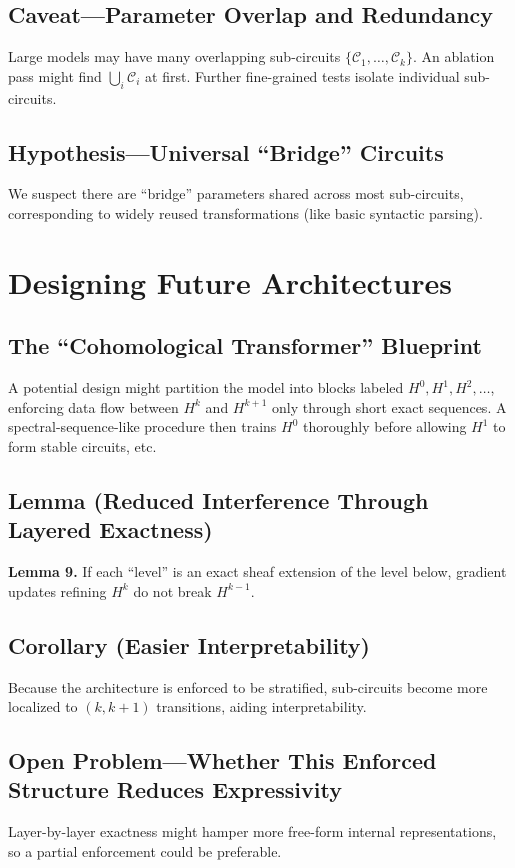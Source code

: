 \documentclass{article}
\begin{document}
\subsection{Caveat—Parameter Overlap and Redundancy}
Large models may have many overlapping sub-circuits $\{\mathcal{C}_1,\dots,\mathcal{C}_k\}$. An ablation pass might find $\bigcup_i \mathcal{C}_i$ at first. Further fine-grained tests isolate individual sub-circuits.

\subsection{Hypothesis—Universal “Bridge” Circuits}
We suspect there are “bridge” parameters shared across most sub-circuits, corresponding to widely reused transformations (like basic syntactic parsing).

\section{Designing Future Architectures}

\subsection{The “Cohomological Transformer” Blueprint}
A potential design might partition the model into blocks labeled $H^0, H^1, H^2, \dots$, enforcing data flow between $H^k$ and $H^{k+1}$ only through short exact sequences. A spectral-sequence-like procedure then trains $H^0$ thoroughly before allowing $H^1$ to form stable circuits, etc.

\subsection{Lemma (Reduced Interference Through Layered Exactness)}
\textbf{Lemma 9.}  
If each “level” is an exact sheaf extension of the level below, gradient updates refining $H^k$ do not break $H^{k-1}$.

\subsection{Corollary (Easier Interpretability)}
Because the architecture is enforced to be stratified, sub-circuits become more localized to $(k,k+1)$ transitions, aiding interpretability.

\subsection{Open Problem—Whether This Enforced Structure Reduces Expressivity}
Layer-by-layer exactness might hamper more free-form internal representations, so a partial enforcement could be preferable.
\end{document}
